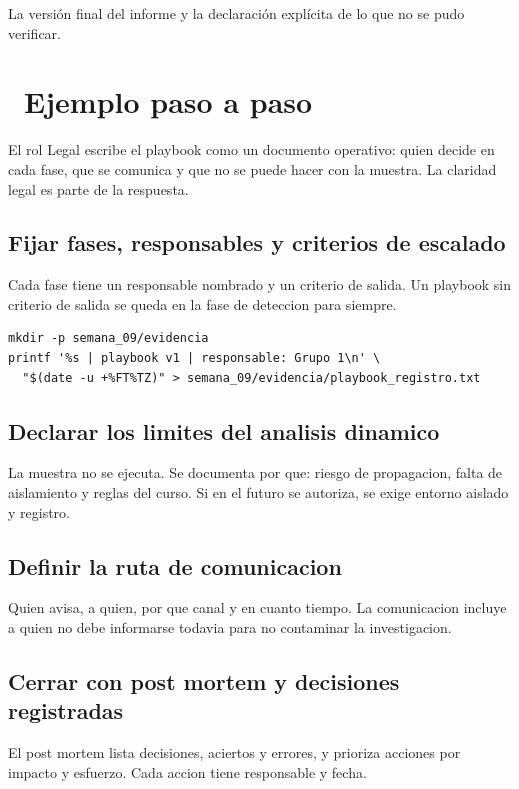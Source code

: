 \documentclass[11pt,a4paper]{article}
\newcommand{\iconotexto}[2]{\textcolor{cyanNeon}{\faIcon{#1}}~#2}
\begin{document}
La versión final del informe y la declaración explícita de lo que no se pudo verificar.

\section{\iconotexto{list-ol}{Ejemplo paso a paso}}

El rol Legal escribe el playbook como un documento operativo: quien decide en cada fase, que se comunica y que no se puede hacer con la muestra. La claridad legal es parte de la respuesta.

\subsection{Fijar fases, responsables y criterios de escalado}

Cada fase tiene un responsable nombrado y un criterio de salida. Un playbook sin criterio de salida se queda en la fase de deteccion para siempre.

\begin{lstlisting}[style=estiloCodigo]
mkdir -p semana_09/evidencia
printf '%s | playbook v1 | responsable: Grupo 1\n' \
  "$(date -u +%FT%TZ)" > semana_09/evidencia/playbook_registro.txt
\end{lstlisting}

\subsection{Declarar los limites del analisis dinamico}

La muestra no se ejecuta. Se documenta por que: riesgo de propagacion, falta de aislamiento y reglas del curso. Si en el futuro se autoriza, se exige entorno aislado y registro.

\subsection{Definir la ruta de comunicacion}

Quien avisa, a quien, por que canal y en cuanto tiempo. La comunicacion incluye a quien no debe informarse todavia para no contaminar la investigacion.

\subsection{Cerrar con post mortem y decisiones registradas}

El post mortem lista decisiones, aciertos y errores, y prioriza acciones por impacto y esfuerzo. Cada accion tiene responsable y fecha.
\end{document}
